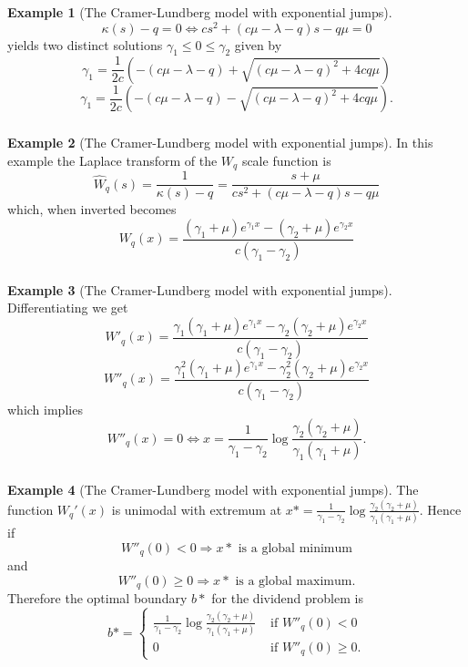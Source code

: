 \documentclass[xcolor=pdftex,dvipsnames,table]{beamer}
\theoremstyle{definition}
\newtheorem*{ex}{Example}
\def\lt{\left}
\def\rt{\right}
\begin{document}
\begin{frame}
\frametitle{\insertsectionhead}
\begin{ex}[The Cramer-Lundberg model with exponential jumps]
\[
\kappa(s)-q = 0 \iff cs^2 + (c\mu -\lambda -q ) s -q\mu = 0
\] 
yields two distinct solutions $\gamma_1 \leq 0 \leq \gamma_2$ given by
\[
\gamma_1 = \frac{1}{2c} \lt( -(c\mu -\lambda -q ) + \sqrt{ (c\mu -\lambda -q )^2 + 4 c q\mu} \rt)
\]
\[
\gamma_1 = \frac{1}{2c} \lt( -(c\mu -\lambda -q ) - \sqrt{ (c\mu -\lambda -q )^2 + 4 c q\mu} \rt).
\]
\end{ex}
\end{frame}


\begin{frame}
\frametitle{\insertsectionhead}
\begin{ex}[The Cramer-Lundberg model with exponential jumps]
In this example the Laplace transform of the $W_q$ scale function is
\[
\hat{W}_q(s) = \frac{1}{\kappa(s)-q} = \frac{s + \mu}{cs^2 + (c\mu -\lambda -q ) s -q\mu}
\]
which, when inverted becomes
\[
W_q(x) = \frac{(\gamma_1 + \mu)e^{\gamma_1 x} - (\gamma_2 + \mu) e^{\gamma_2 x} }{c(\gamma_1 - \gamma_2)}
\]
\end{ex}
\end{frame}

\begin{frame}
\frametitle{\insertsectionhead}
\begin{ex}[The Cramer-Lundberg model with exponential jumps]
Differentiating we get
\[
W'_q(x) = \frac{\gamma_1(\gamma_1 + \mu)e^{\gamma_1 x} - \gamma_2(\gamma_2 + \mu) e^{\gamma_2 x} }{c(\gamma_1 - \gamma_2)}
\]
\[
W''_q(x) = \frac{\gamma_1^2(\gamma_1 + \mu)e^{\gamma_1 x} - \gamma_2^2(\gamma_2 + \mu) e^{\gamma_2 x} }{c(\gamma_1 - \gamma_2)}
\]
which implies
\[
W''_q(x) =0 \iff x = \frac{1}{\gamma_1 - \gamma_2} \log \frac{\gamma_2 (\gamma_2 + \mu)}{\gamma_1 (\gamma_1 + \mu)}.
\]
\end{ex}
\end{frame}

\begin{frame}
\frametitle{\insertsectionhead}
\begin{ex}[The Cramer-Lundberg model with exponential jumps]
The function $W_q'(x)$ is unimodal with extremum at $x* = \frac{1}{\gamma_1 - \gamma_2} \log \frac{\gamma_2 (\gamma_2 + \mu)}{\gamma_1 (\gamma_1 + \mu)}$. Hence if 
\[
W''_q(0)<0 \Rightarrow x* \text{ is a global minimum}
\]
and
\[
W''_q(0)\geq 0 \Rightarrow x* \text{ is a global maximum}.
\]
Therefore the optimal boundary $b*$ for the dividend problem is
\[
b*=
\begin{cases}
\frac{1}{\gamma_1 - \gamma_2} \log \frac{\gamma_2 (\gamma_2 + \mu)}{\gamma_1 (\gamma_1 + \mu)} & \text{ if } W''_q(0)<0\\
0 & \text{ if } W''_q(0)\geq 0.
\end{cases}
\]
\end{ex}
\end{frame}
\end{document}
